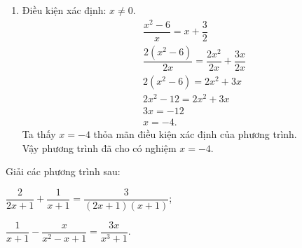 \begin{bt}
{\begin{enumerate}
\begin{align*}
	&-2x = -4 \\
	&x = 2.
	\end{align*}
	Ta thấy $x=2$ không thỏa mãn điều kiện xác định của phương trình.\\
	Vậy phương trình đã cho vô nghiệm.
	\item Điều kiện xác định: $x \ne 0$.\\
	\begin{align*}
	&\dfrac{x^2-6}{x} = x + \dfrac{3}{2} \\
	&\dfrac{2(x^2-6)}{2x} = \dfrac{2x^2}{2x} + \dfrac{3x}{2x} \\
	&2(x^2-6) = 2x^2 + 3x \\
	&2x^2 -12 = 2x^2 + 3x \\
	&3x = -12 \\
	&x = -4.
	\end{align*}
	Ta thấy $x=-4$ thỏa mãn điều kiện xác định của phương trình.\\
	Vậy phương trình đã cho có nghiệm $x=-4$.
	\end{enumerate}
	}
\end{bt}
\begin{bt}
	Giải các phương trình sau:
	\begin{enumEX}{2}
	\item $\dfrac2{2x+1}+\dfrac1{x+1}=\dfrac3{(2x+1)(x+1)}$;
	\item $\dfrac1{x+1}-\dfrac x{x^2-x+1}=\dfrac{3x}{x^3+1}$.
	\end{enumEX}
\end{bt}
